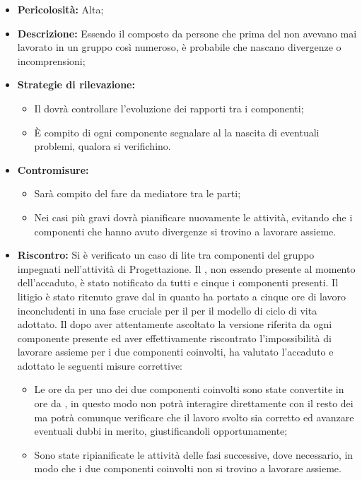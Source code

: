\begin{itemize}
\item \textbf{Pericolosità:} Alta;
\item \textbf{Descrizione:} Essendo il  composto da persone che prima del  non avevano mai lavorato in un gruppo così numeroso, è probabile che nascano divergenze o incomprensioni;
\item \textbf{Strategie di rilevazione:}
\begin{itemize}
\item Il \rRP dovrà controllare l'evoluzione dei rapporti tra i componenti;
\item \`E compito di ogni componente segnalare al \rRP la nascita di eventuali problemi, qualora si verifichino.
\end{itemize}
\item \textbf{Contromisure:}
\begin{itemize}
\item Sarà compito del \rRP fare da mediatore tra le parti;
\item Nei casi più gravi dovrà pianificare nuovamente le attività, evitando che i componenti che hanno avuto divergenze si trovino a lavorare assieme.
\end{itemize}
\item \textbf{Riscontro:} Si è verificato un caso di lite tra componenti del gruppo impegnati nell'attività di Progettazione.
Il \rRP, non essendo presente al momento dell'accaduto, è stato notificato da tutti e cinque i componenti presenti.
Il litigio è stato ritenuto grave dal \rRP in quanto ha portato a cinque ore di lavoro inconcludenti in una fase cruciale per il  per il modello di ciclo di vita adottato. Il \rRP dopo aver attentamente ascoltato la versione riferita da ogni componente presente ed aver effettivamente riscontrato l'impossibilità di lavorare assieme per i due componenti coinvolti,  ha valutato l'accaduto e adottato le seguenti misure correttive:
\begin{itemize}
\item Le ore da \rP per uno dei due componenti coinvolti sono state convertite in ore da \rV, in questo modo non potrà interagire direttamente con il resto dei \rPs ma potrà comunque verificare che il lavoro svolto sia corretto ed avanzare eventuali dubbi in merito, giustificandoli opportunamente;
\item Sono state ripianificate le attività delle fasi successive, dove necessario, in modo che i due componenti coinvolti non si trovino a lavorare assieme.
\end{itemize}
\end{itemize}
